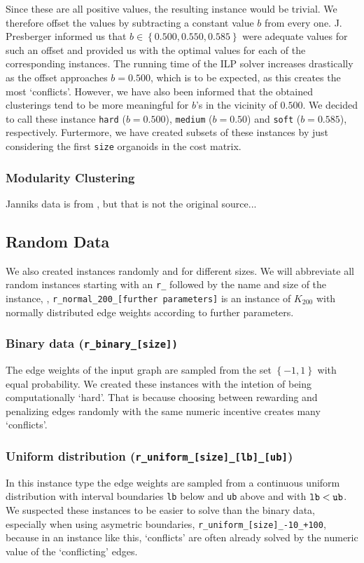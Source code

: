 Since these are all positive values, the resulting \CP instance would be trivial.
We therefore offset the values by subtracting a constant value $b$ from every one.
J. Presberger informed us that $b \in \left\{ 0.500, 0.550, 0.585 \right\}$ were adequate values for such an offset and provided us with the optimal values for each of the corresponding instances.
The running time of the ILP solver increases drastically as the offset approaches $b = 0.500$, which is to be expected, as this creates the most ‘conflicts’.
However, we have also been informed that the obtained clusterings tend to be more meaningful for $b$’s in the vicinity of $0.500$.
We decided to call these instance \texttt{hard} ($b= 0.500$), \texttt{medium} ($b = 0.50$) and \texttt{soft} ($b = 0.585$), respectively.
Furtermore, we have created subsets of these instances by just considering the first \texttt{size} organoids in the cost matrix.

\subsubsection{Modularity Clustering}
Janniks data is from \cite{kappesComparativeStudyModern2015}, but that is not the original source...


\subsection{Random Data}\label{subsec:random_data}
We also created \CP instances randomly and for different sizes.
We will abbreviate all random instances starting with an \texttt{r\_} followed by the name and size of the instance,
\eg, \texttt{r\_normal\_200\_[further parameters]} is an instance of $K_{200}$ with normally distributed edge weights according to further parameters.

\subsubsection{Binary data (\texttt{r\_binary\_[size])}}\label{subsubsec:data_random_binary}
The edge weights of the input graph are sampled from the set $\left\{ -1, 1 \right\}$ with equal probability.
We created these instances with the intetion of being computationally ‘hard’.
That is because choosing between rewarding and penalizing edges randomly with the same numeric incentive creates many ‘conflicts’.

\subsubsection{Uniform distribution (\texttt{r\_uniform\_[size]\_[lb]\_[ub]})}\label{subsubsec:data_random_uniform}
In this instance type the edge weights are sampled from a continuous uniform distribution with interval boundaries \texttt{lb} below and \texttt{ub} above and with $\text{\texttt{lb}} < \text{\texttt{ub}}$.
We suspected these instances to be easier to solve than the binary data, especially when using asymetric boundaries, \eg \texttt{r\_uniform\_[size]\_-10\_+100}, because in an instance like this, ‘conflicts’ are often already solved by the numeric value of the ‘conflicting’ edges.

